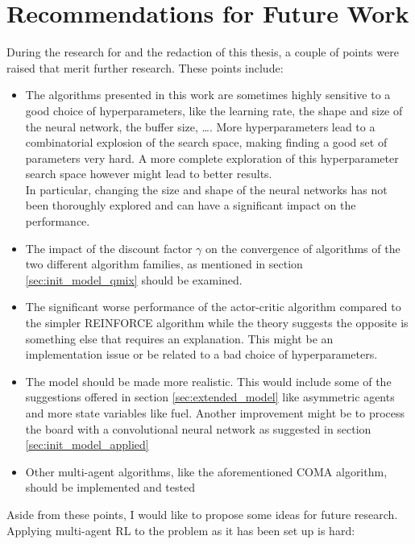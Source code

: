 \chapter{Recommendations for Future Work}
\label{ch:future_work}
During the research for and the redaction of this thesis, a couple of points were raised that merit further research. These points include:
\begin{itemize}
    \item The algorithms presented in this work are sometimes highly sensitive to a good choice of hyperparameters, like the learning rate, the shape and size of the neural network, the buffer size, \ldots. More hyperparameters lead to a combinatorial explosion of the search space, making finding a good set of parameters very hard. A more complete exploration of this hyperparameter search space however might lead to better results.\\
    In particular, changing the size and shape of the neural networks has not been thoroughly explored and can have a significant impact on the performance. 
    \item The impact of the discount factor $\gamma$ on the convergence of algorithms of the two different algorithm families, as mentioned in section \ref{sec:init_model_qmix} should be examined.
    \item The significant worse performance of the actor-critic algorithm compared to the simpler REINFORCE algorithm while the theory suggests the opposite is something else that requires an explanation. This might be an implementation issue or be related to a bad choice of hyperparameters.
    \item The model should be made more realistic. This would include some of the suggestions offered in section \ref{sec:extended_model} like asymmetric agents and more state variables like fuel. Another improvement might be to process the board with a convolutional neural network as suggested in section \ref{sec:init_model_applied}
    \item Other multi-agent algorithms, like the aforementioned COMA algorithm, should be implemented and tested
\end{itemize}
Aside from these points, I would like to propose some ideas for future research. Applying multi-agent RL to the problem as it has been set up is hard:

